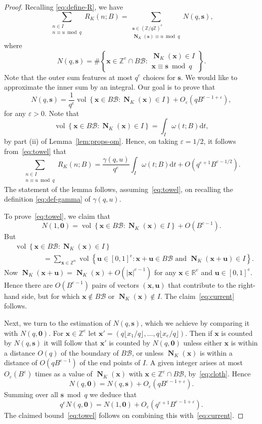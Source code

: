 \documentclass[11pt,letterpaper]{amsart}
\renewcommand{\d}{\mathrm{d}}
\theoremstyle{definition}
\numberwithin{equation}{section}
\newcommand\RR{\mathbb{R}}
\newcommand\ZZ{\mathbb{Z}}
\newcommand{\x}{\mathbf{x}}
\newcommand{\s}{\mathbf{s}}
\renewcommand{\u}{\mathbf{u}}
\newcommand{\ve}{\varepsilon}
\DeclareMathOperator{\vol}{vol}
\DeclareMathOperator{\n}{N}
\DeclareMathOperator{\nf}{\mathbf{N}}
\newcommand{\0}{\mathbf{0}}
\begin{document}
\begin{proof}
Recalling
\eqref{eq:define-R},
we have 
$$
\sum_{\substack{n\in I\\n\equiv u\bmod q}}R_K(n;B)=
\sum_{
\substack{
\s\in (\ZZ/q\ZZ)^e\\
\nf_K(\s)\equiv u\bmod q
}} N(q,\s),
$$
where
$$
N(q,\s)=\#\left\{\x\in \ZZ^e\cap B\mathcal{B}: 
\begin{array}{l}
\nf_K(\x)\in I\\
 \x\equiv \s\bmod{q}
 \end{array}
 \right\}.
$$
Note that the outer sum features at most $q^e$ choices for $\s$.
We would like to approximate the inner sum by an integral. 
Our goal is to prove that 
\begin{equation}\label{eq:towel}
N(q,\s)=\frac{1}{q^e} \vol\left\{\x\in B\mathcal{B}: \nf_K(\x)\in I\right\} +O_\ve(q B^{e-1+\ve}),
\end{equation}
for any $\ve>0$. 
Note that 
$$
\vol\left\{\x\in B\mathcal{B}: \nf_K(\x)\in I\right\} =\int_{I}\omega(t;B)\d t,
$$
by part (ii) of Lemma~\ref{lem:props-om}. Hence,
on taking  $\ve=1/2$,  it follows from~\eqref{eq:towel} that 
$$
\sum_{\substack{n\in I\\n\equiv u\bmod q}}R_K(n;B)=
\frac{\gamma(q,u)}{q^e} \int_{I}\omega(t;B)\d t 
+O(q^{e+1}B^{e-1/2}).
$$
The statement of the lemma follows, assuming~\eqref{eq:towel}, on recalling the definition 
\eqref{eq:def-gamma} of $\gamma(q,u)$.



To prove~\eqref{eq:towel}, we claim that 
\begin{equation}\label{eq:current}
N(1,\0)=
\vol\left\{\x\in B\mathcal{B}: \nf_K(\x)\in I\right\}+O(B^{e-1}).
\end{equation}
But 
\begin{align*}
&\vol\left\{\x\in B\mathcal{B}: \nf_K(\x)\in I\right\}\\
&\qquad\qquad=
\sum_{\x\in \ZZ^n} 
\vol\left\{\u\in [0,1]^e: \text{$\x+\u\in B\mathcal{B}$ and $\nf_K(\x+\u)\in I$}\right\}.
\end{align*}
Now $\nf_K(\x+\u)=\nf_K(\x)+O(|\x|^{e-1})$ for any $\x\in \RR^e$ and 
 $\u\in [0,1]^e$. Hence there  are  $O(B^{e-1})$ pairs of vectors $(\x,\u)$ that contribute to the right-hand side, but for which 
$\x\not \in B\mathcal{B}$ or  $\nf_K(\x)\not \in I$. The claim~\eqref{eq:current} follows. 

Next, we turn to the  estimation of $N(q,\s)$, which we achieve by comparing it with $N(q,\0)$. 
For $\x\in \ZZ^e$ let $\x'=(q\lfloor x_1/q\rfloor,\dots,q\lfloor x_e/q\rfloor)$.
Then if $\x$ is counted by $N(q,\s)$ it will follow that 
$\x'$ is counted by $N(q,\0)$ unless either $\x$ is within a distance $O(q)$ of the boundary 
of $B\mathcal{B}$, or unless $\nf_K(\x)$ is within a distance of $O(qB^{e-1})$ of the end points of $I$. 
A  given  integer  arises at most $O_\ve(B^\ve)$ times as a value of $\nf_K(\x)$ with
$\x\in \ZZ^e\cap B\mathcal{B}$, by~\eqref{eq:cloth}.
Hence
$$
N(q,\0)=N(q,\s)+O_\ve(qB^{e-1+\ve}).
$$
Summing over all $\s \bmod{q}$ we deduce that 
$$
q^e N(q,\0) = N(1,\0)+O_\ve(q^{e+1}B^{e-1+\ve}).
$$
The claimed bound~\eqref{eq:towel} follows on 
combining this with~\eqref{eq:current}.
\end{proof}
\end{document}
